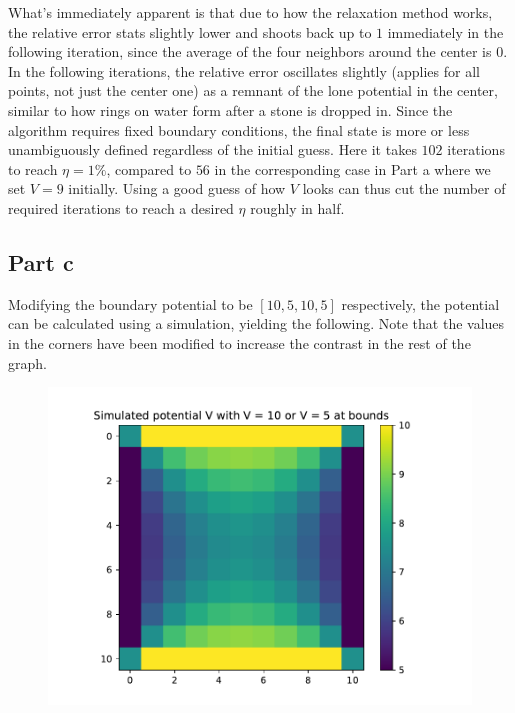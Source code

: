 \documentclass[a4paper,12pt]{article}
\begin{document}
What's immediately apparent is that due to how the relaxation method works, the relative error stats slightly lower
and shoots back up to $1$ immediately in the following iteration, since the average of the four neighbors around the
center is $0$. In the following iterations, the relative error oscillates slightly (applies for all points, not just
the center one) as a remnant of the lone potential in the center, similar to how rings on water form after a stone is
dropped in. Since the algorithm requires fixed boundary conditions, the final state is more or less unambiguously defined
regardless of the initial guess. Here it takes $102$ iterations to reach $\eta = 1\%$, compared to $56$ in the
corresponding case in Part a where we set $V = 9$ initially. Using a good guess of how $V$ looks can thus cut the
number of required iterations to reach a desired $\eta$ roughly in half.

\subsection*{Part c}

Modifying the boundary potential to be $[10, 5, 10, 5]$ respectively, the potential can be calculated using a
simulation, yielding the following. Note that the values in the corners have been modified to increase the contrast
in the rest of the graph.

\begin{figure}[!ht]
  \centering
  \includegraphics[scale=0.49]{img/4_1c_simulated_105105.pdf}
\end{figure}
\end{document}

